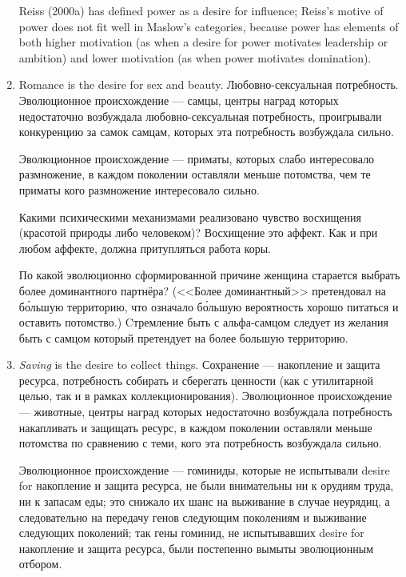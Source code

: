 \documentclass[11pt]{article}
\theoremstyle{remark}
\theoremstyle{definition}
\begin{document}
\begin{enumerate}

Reiss (2000a) has defined power as a desire for influence; Reiss’s motive of power does not fit well in Maslow’s categories, because power has elements of both higher motivation (as when a desire for power motivates leadership or ambition) and lower motivation (as when power motivates domination).

\item Romance is the desire for sex and beauty. Любовно-сексуальная потребность. Эволюционное происхождение --- самцы, центры наград которых недостаточно возбуждала любовно-сексуальная потребность, проигрывали конкуренцию за самок самцам, которых эта потребность возбуждала сильно.

Эволюционное происхождение --- приматы, которых слабо интересовало размножение, в каждом поколении оставляли меньше потомства, чем те приматы кого размножение интересовало сильно.


Какими психическими механизмами реализовано чувство восхищения (красотой природы либо человеком)? Восхищение это аффект. Как и при любом аффекте, должна притупляться работа коры.

По какой эволюционно сформированной причине женщина старается выбрать более доминантного партнёра? (<<Более доминантный>> претендовал на б\'{о}льшую территорию, что означало б\'{о}льшую вероятность хорошо питаться и оставить потомство.) Cтремление быть с альфа-самцом следует из желания быть с самцом который претендует на более большую территорию. 

\item \textit{Saving} is the desire to collect things. Сохранение --- накопление и защита ресурса, потребность собирать и сберегать ценности (как с утилитарной целью, так и в рамках коллекционирования). Эволюционное происхождение --- животные, центры наград которых недостаточно возбуждала потребность накапливать и защищать ресурс, в каждом поколении оставляли меньше потомства по сравнению с теми, кого эта потребность возбуждала сильно.

Эволюционное происхождение --- гоминиды, которые не испытывали desire for накопление и защита ресурса, не были внимательны ни к орудиям труда, ни к запасам еды; это снижало их шанс на выживание в случае неурядиц, а следовательно на передачу генов следующим поколениям и выживание следующих поколений; так гены гоминид, не испытывавших desire for накопление и защита ресурса, были постепенно вымыты эволюционным отбором. 


\end{enumerate}
\end{document}
